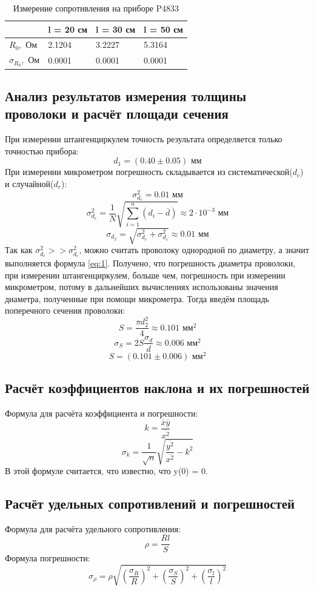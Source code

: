 \documentclass{article}
\begin{document}
\begin{table}[H]
    \label{tab:6}
    \begin{center}
        \begin{tabular}{|l|l|l|l|}
            \hline
                                         & l = 20 см & l = 30 см & l = 50 см \\
            \hline
            $R_0, \textrm{ Ом}$          & 2.1204    & 3.2227    & 5.3164    \\
            $\sigma_{R_0}, \textrm{ Ом}$ & 0.0001    & 0.0001    & 0.0001    \\
            \hline
        \end{tabular}
    \end{center}
    \caption{Измерение сопротивления на приборе P4833}
\end{table}

\subsection{Анализ результатов измерения толщины проволоки и расчёт площади сечения} \label{sec:app_4}
При измерении штангенциркулем точность результата определяется только точностью прибора:
$$d_1 = (0.40 \pm 0.05) \textrm{ мм}$$
При измерении микрометром погрешность складывается из систематической($d_c$) и случайной($d_r$):
$$\sigma_{d_r}^2 = 0.01 \textrm{ мм}$$
$$\sigma_{d_c}^2 = \frac{1}{N}\sqrt{\sum_{i=1}^{n}{(d_i - \overline{d})}} \approx 2\cdot10^{-3} \textrm{ мм}$$
$$\sigma_{d_2} = \sqrt{\sigma_{d_r}^2 + \sigma_{d_c}^2} \approx 0.01 \textrm{ мм}$$
Так как $\sigma_{d_r}^2 >> \sigma_{d_c}^2$, можно считать проволоку однородной по диаметру, а значит выполняется формула \ref{eq:1}.
Получено, что погрешность диаметра проволоки, при измерении штангенциркулем, больше чем, погрешность при измерении
микрометром, потому в дальнейших вычислениях использованы значения диаметра, полученные при помощи микрометра.
Тогда введём площадь поперечного сечения проволоки:
$$S = \frac{\pi{d_2^2}}{4} \approx 0.101\textrm{ мм}^2$$
$$\sigma_S = 2S\frac{\sigma_d}{d} \approx 0.006\textrm{ мм}^2$$
$$S = (0.101\pm0.006)\textrm{ мм}^2$$

\subsection{Расчёт коэффициентов наклона и их погрешностей}\label{sec:app_5}
Формула для расчёта коэффициента и погрешности:
$$k = \frac{\overline{x}\overline{y}}{\overline{x^2}}$$
$$\sigma_k = \frac{1}{\sqrt{n}}\sqrt{\frac{\overline{y^2}}{\overline{x^2}} - k^2}$$
В этой формуле считается, что известно, что y(0) = 0.
\subsection{Расчёт удельных сопротивлений и погрешностей}\label{sec:app_6}
Формула для расчёта удельного сопротивления:
$$\rho = \frac{Rl}{S}$$
Формула погрешности:
$$\sigma_{\rho} = \rho\sqrt{(\frac{\sigma_R}{R})^2 + (\frac{\sigma_S}{S})^2 + (\frac{\sigma_l}{l})^2}$$
\end{document}

